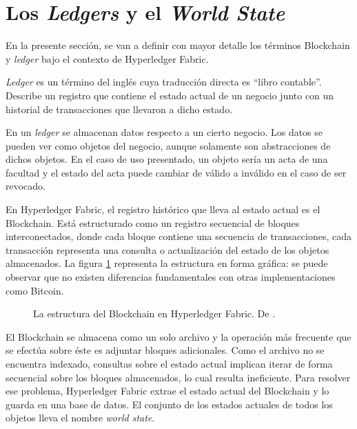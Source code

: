\section{Los \textit{Ledgers} y el \textit{World State}} \label{sec:ledger_and_world_state}
En la presente sección, se van a definir con mayor detalle los términos Blockchain y \textit{ledger} bajo el contexto de Hyperledger Fabric.

\textit{Ledger} es un término del inglés cuya traducción directa es ``libro contable''. Describe un registro que contiene el estado actual de un negocio junto con un historial de transacciones que llevaron a dicho estado.

En un \textit{ledger} se almacenan datos respecto a un cierto negocio. Los datos se pueden ver como objetos del negocio, aunque solamente son abstracciones de dichos objetos. En el caso de uso presentado, un objeto sería un acta de una facultad y el estado del acta puede cambiar de válido a inválido en el caso de ser revocado.

En Hyperledger Fabric, el registro histórico que lleva al estado actual es el Blockchain. Está estructurado como un registro secuencial de bloques interconectados, donde cada bloque contiene una secuencia de transacciones, cada transacción representa una consulta o actualización del estado de los objetos almacenados. La figura \ref{fig:bc_hlf} representa la estructura en forma gráfica: se puede observar que no existen diferencias fundamentales con otras implementaciones como Bitcoin.

\begin{figure}[H]
    \caption{La estructura del Blockchain en Hyperledger Fabric. De \cite{hlf-ledger}.}
    \label{fig:bc_hlf}
\end{figure}

El Blockchain se almacena como un solo archivo y la operación más frecuente que se efectúa sobre éste es adjuntar bloques adicionales. Como el archivo no se encuentra indexado, consultas sobre el estado actual implican iterar de forma secuencial sobre los bloques almacenados, lo cual resulta ineficiente. Para resolver ese problema, Hyperledger Fabric extrae el estado actual del Blockchain y lo guarda en una base de datos. El conjunto de los estados actuales de todos los objetos lleva el nombre \textit{world state}.

